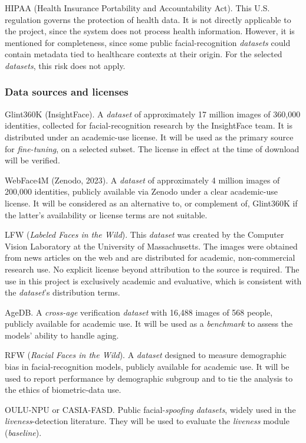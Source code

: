 \documentclass[
  11pt, %
]{charter}
\begin{document}
HIPAA (Health Insurance Portability and Accountability Act). This U.S. regulation governs the protection of health data. It is not directly applicable to the project, since the system does not process health information. However, it is mentioned for completeness, since some public facial-recognition \textit{datasets} could contain metadata tied to healthcare contexts at their origin. For the selected \textit{datasets}, this risk does not apply.

\subsubsection{Data sources and licenses}

Glint360K (InsightFace). A \textit{dataset} of approximately 17 million images of 360,000 identities, collected for facial-recognition research by the InsightFace team. It is distributed under an academic-use license. It will be used as the primary source for \textit{fine-tuning}, on a selected subset. The license in effect at the time of download will be verified.

WebFace4M (Zenodo, 2023). A \textit{dataset} of approximately 4 million images of 200,000 identities, publicly available via Zenodo under a clear academic-use license. It will be considered as an alternative to, or complement of, Glint360K if the latter's availability or license terms are not suitable.

LFW (\textit{Labeled Faces in the Wild}). This \textit{dataset} was created by the Computer Vision Laboratory at the University of Massachusetts. The images were obtained from news articles on the web and are distributed for academic, non-commercial research use. No explicit license beyond attribution to the source is required. The use in this project is exclusively academic and evaluative, which is consistent with the \textit{dataset}'s distribution terms.

AgeDB. A \textit{cross-age} verification \textit{dataset} with 16,488 images of 568 people, publicly available for academic use. It will be used as a \textit{benchmark} to assess the models' ability to handle aging.

RFW (\textit{Racial Faces in the Wild}). A \textit{dataset} designed to measure demographic bias in facial-recognition models, publicly available for academic use. It will be used to report performance by demographic subgroup and to tie the analysis to the ethics of biometric-data use.

OULU-NPU or CASIA-FASD. Public facial-\textit{spoofing} \textit{datasets}, widely used in the \textit{liveness}-detection literature. They will be used to evaluate the \textit{liveness} module (\textit{baseline}).
\end{document}
